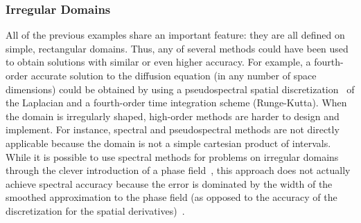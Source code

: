 \documentclass[oneeqnum,onefignum,onetabnum,onethmnum]{siamltex}
\begin{document}
\subsubsection{Irregular Domains}
All of the previous examples share an important feature: they are all
defined on simple, rectangular domains.  Thus, any of several methods 
could have been used to obtain solutions with similar or even higher accuracy.
For example, a fourth-order accurate solution to the diffusion equation
(in any number of space dimensions) could be obtained by using a 
pseudospectral spatial discretization~\cite{trefethen_spectral_book, 
boyd_spectral_book} of the Laplacian and a fourth-order time integration scheme 
(\eg Runge-Kutta).  When the domain is irregularly shaped, high-order methods 
are harder to design and implement.  For instance, spectral and pseudospectral 
methods are not directly applicable because the domain is not a simple 
cartesian product of intervals.  While it is possible to use spectral methods
for problems on irregular domains through the clever introduction of a phase 
field~\cite{bueno_orovio_2006, feng_2006}, this approach does not 
actually achieve spectral accuracy because the error is dominated by the 
width of the smoothed approximation to the phase field (as opposed to the 
accuracy of the discretization for the spatial 
derivatives)~\cite{bueno_orovio_2006}.
\end{document}
